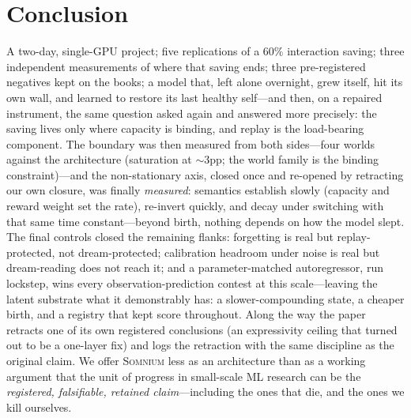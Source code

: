 \documentclass[11pt,a4paper]{article}
\newcommand{\som}{\textsc{Somnium}}
\begin{document}
\section{Conclusion}

A two-day, single-GPU project; five replications of a $60\%$ interaction saving; three independent measurements of where that saving ends; three pre-registered negatives kept on the books; a model that, left alone overnight, grew itself, hit its own wall, and learned to restore its last healthy self---and then, on a repaired instrument, the same question asked again and answered more precisely: the saving lives only where capacity is binding, and replay is the load-bearing component. The boundary was then measured from both sides---four worlds against the architecture (saturation at ${\sim}$3pp; the world family is the binding constraint)---and the non-stationary axis, closed once and re-opened by retracting our own closure, was finally \emph{measured}: semantics establish slowly (capacity and reward weight set the rate), re-invert quickly, and decay under switching with that same time constant---beyond birth, nothing depends on how the model slept. The final controls closed the remaining flanks: forgetting is real but replay-protected, not dream-protected; calibration headroom under noise is real but dream-reading does not reach it; and a parameter-matched autoregressor, run lockstep, wins every observation-prediction contest at this scale---leaving the latent substrate what it demonstrably has: a slower-compounding state, a cheaper birth, and a registry that kept score throughout. Along the way the paper retracts one of its own registered conclusions (an expressivity ceiling that turned out to be a one-layer fix) and logs the retraction with the same discipline as the original claim. We offer \som{} less as an architecture than as a working argument that the unit of progress in small-scale ML research can be the \emph{registered, falsifiable, retained claim}---including the ones that die, and the ones we kill ourselves.


\begingroup
\footnotesize
\setlength{\bibsep}{2.2pt}

\endgroup

\end{document}
